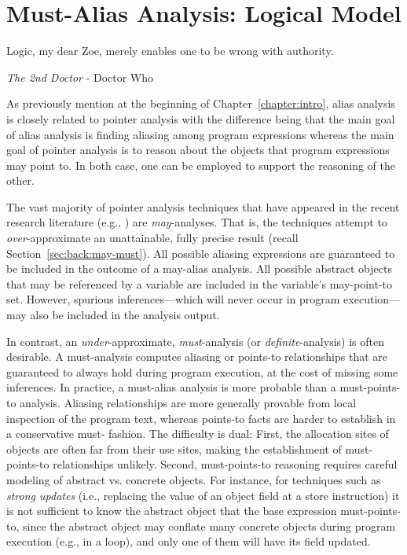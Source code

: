 \chapter{Must-Alias Analysis: Logical Model}
\label{chapter:must-logic}
\epigraph{Logic, my dear Zoe, merely enables one to be wrong with authority.}{\textit{The 2nd Doctor} - Doctor Who}

As previously mention at the beginning of Chapter~\ref{chapter:intro}, alias analysis is closely related to pointer analysis with the difference being that the main goal of alias analysis is finding aliasing among program expressions whereas the main goal of pointer analysis is to reason about the objects that program expressions may point to. In both case, one can be employed to support the reasoning of the other.

The vast majority of pointer analysis techniques that have appeared in the recent research literature (e.g., \cite{pldi:1999:Yong,pldi:2003:Berndl,cc:2013:Kastrinis,pldi:2007:Hardekopf,article:2005:Milanova,pldi:2004:Whaley,pldi:2006:Sridharan}) are \emph{may}-analyses. That is, the techniques attempt to \emph{over}-approximate an unattainable, fully precise result (recall Section~\ref{sec:back:may-must}). All possible aliasing expressions are guaranteed to be included in the outcome of a may-alias analysis. All possible abstract objects that may be referenced by a variable are included in the variable's may-point-to set. However, spurious inferences---which will never occur in program execution---may also be included in the analysis output.

In contrast, an \emph{under}-approximate, \emph{must}-analysis (or \emph{definite}-analysis) is often desirable. A must-analysis computes aliasing or points-to relationships that are guaranteed to always hold during program execution, at the cost of missing some inferences. In practice, a must-alias analysis is more probable than a must-points-to analysis. Aliasing relationships are more generally provable from local inspection of the program text, whereas points-to facts are harder to establish in a conservative must- fashion. The difficulty is dual: First, the allocation sites of objects are often far from their use sites, making the establishment of must-points-to relationships unlikely. Second, must-points-to reasoning requires careful modeling of abstract vs. concrete objects. For instance, for techniques such as \emph{strong updates} (i.e., replacing the value of an object field at a store instruction) it is not sufficient to know the abstract object that the base expression must-points-to, since the abstract object may conflate many concrete objects during program execution (e.g., in a loop), and only one of them will have its field updated.

